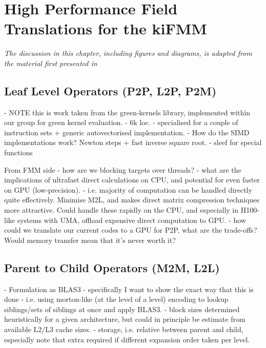 \chapter{High Performance Field Translations for the kiFMM}\label{chpt:field_translation}
\thispagestyle{chaptertitle} %

\begin{center}
    \textit{The discussion in this chapter, including figures and diagrams, is adapted from the material first presented in \cite{kailasa2024m2ltranslationoperatorskernel} }
\end{center}




\section{Leaf Level Operators (P2P, L2P, P2M)}

- NOTE this is work taken from the green-kernels library, implemented within our group for green kernel evaluation.
- 6k loc.
- specialised for a couple of instruction sets + generic autovectorised implementation.
- How do the SIMD implementations work? Newton steps + fast inverse square root.
- sleef for special functions

From FMM side
- how are we blocking targets over threads?
- what are the implications of ultrafast direct calculations on CPU, and potential for even faster on GPU (low-precision).
- i.e. majority of computation can be handled directly quite effectively. Minimise M2L, and makes direct matrix compression techniques more attractive. Could handle these rapidly on the CPU, and especially in H100-like systems with UMA, offload expensive direct computation to GPU.
- how could we translate our current codes to a GPU for P2P, what are the trade-offs? Would memory transfer mean that it's never worth it?

\section{Parent to Child Operators (M2M, L2L)}

- Formulation as BLAS3
    - specifically I want to show the exact way that this is done
    - i.e. using morton-like (at the level of a level) encoding to lookup siblings/sets of siblings at once and apply BLAS3.
    - block sizes determined heuristically for a given architecture, but could in principle be estimate from available L2/L3 cache sizes.
    - storage, i.e. relative between parent and child, especially note that extra required if different expansion order taken per level.

